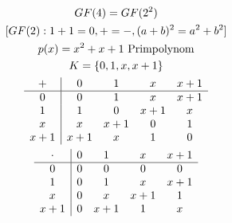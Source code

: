 \begin{bsp*}
	\begin{gather*}
		GF(4) = GF(2^2) \\
		[ GF(2): 1+1=0 , + = - , (a+b)^2 = a^2 + b^2 ] \\
		p(x) = x^2 + x + 1 \text{ Primpolynom} \\
		K = \{ 0 , 1 , x , x+1 \} \\
		\begin{array}{ c | c c c c }
		+	&0	&1	&x	&x+1	\\ \hline
		0	&0	&1	&x	&x+1	\\
		1	&1	&0	&x+1	&x	\\
		x	&x	&x+1	&0	&1	\\
		x+1	&x+1	&x	&1	&0	
	\end{array} \\
	\begin{array}{ c | c c c c }
		\cdot	&0	&1	&x	&x+1	\\ \hline
		0	&0	&0	&0	&0	\\
		1	&0	&1	&x	&x+1	\\
		x	&0	&x	&x+1	&1	\\
		x+1	&0	&x+1	&1	&x	
	\end{array}
	\end{gather*}
\end{bsp*}

